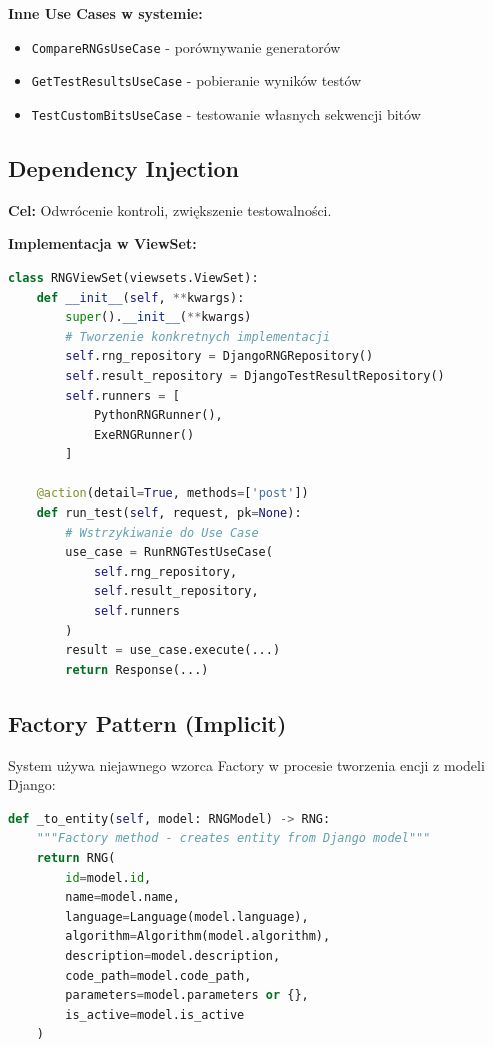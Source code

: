 \documentclass[12pt,a4paper]{article}
\begin{document}
\textbf{Inne Use Cases w systemie:}
\begin{itemize}
    \item \texttt{CompareRNGsUseCase} - porównywanie generatorów
    \item \texttt{GetTestResultsUseCase} - pobieranie wyników testów
    \item \texttt{TestCustomBitsUseCase} - testowanie własnych sekwencji bitów
\end{itemize}

\subsection{Dependency Injection}

\textbf{Cel:} Odwrócenie kontroli, zwiększenie testowalności.

\textbf{Implementacja w ViewSet:}

\begin{lstlisting}[language=Python, caption=Wstrzykiwanie zależności]
class RNGViewSet(viewsets.ViewSet):
    def __init__(self, **kwargs):
        super().__init__(**kwargs)
        # Tworzenie konkretnych implementacji
        self.rng_repository = DjangoRNGRepository()
        self.result_repository = DjangoTestResultRepository()
        self.runners = [
            PythonRNGRunner(),
            ExeRNGRunner()
        ]
    
    @action(detail=True, methods=['post'])
    def run_test(self, request, pk=None):
        # Wstrzykiwanie do Use Case
        use_case = RunRNGTestUseCase(
            self.rng_repository,
            self.result_repository,
            self.runners
        )
        result = use_case.execute(...)
        return Response(...)
\end{lstlisting}

\newpage

\subsection{Factory Pattern (Implicit)}

System używa niejawnego wzorca Factory w procesie tworzenia encji z modeli Django:

\begin{lstlisting}[language=Python, caption=Konwersja Model do Entity]
def _to_entity(self, model: RNGModel) -> RNG:
    """Factory method - creates entity from Django model"""
    return RNG(
        id=model.id,
        name=model.name,
        language=Language(model.language),
        algorithm=Algorithm(model.algorithm),
        description=model.description,
        code_path=model.code_path,
        parameters=model.parameters or {},
        is_active=model.is_active
    )
\end{lstlisting}
\end{document}
